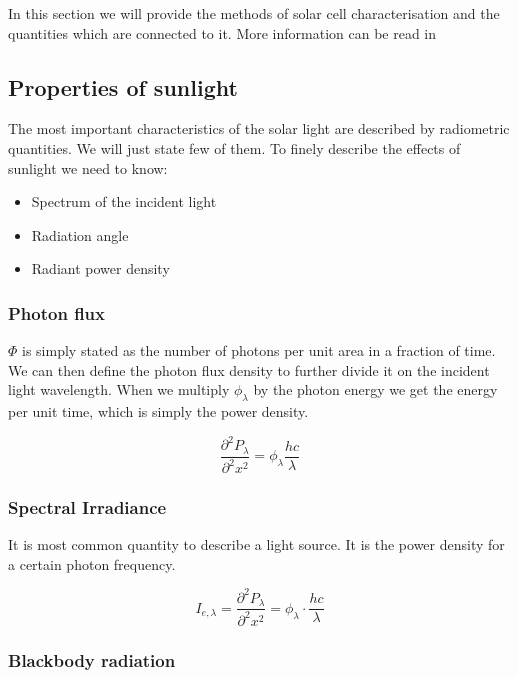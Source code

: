 In this section we will provide the methods of solar cell characterisation and the quantities which are connected to it. More information can be read in \cite{pv}

\subsection{Properties of sunlight}

The most important characteristics of the solar light are described by radiometric quantities. We will just state few of them. To finely describe the effects of sunlight we need to know:

\begin{itemize}
\item Spectrum of the incident light
\item Radiation angle
\item Radiant power density
\end{itemize}

\subsubsection{Photon flux}
$\Phi$ is simply stated as the number of photons per unit area in a fraction of time. We can then define the photon flux density to further divide it on the incident light wavelength. When we multiply $\phi _{\lambda } $ by the photon energy we get the energy per unit time, which is simply the power density. 

\begin{equation}
\frac{\partial ^2 P_\lambda }{\partial ^2 x^2} = \phi _ {\lambda } \frac{hc}{\lambda }
\end{equation}

\subsubsection{Spectral Irradiance}

It is most common quantity to describe a light source. It is the power density for a certain photon frequency. 

\begin{equation}
I_{e,\lambda } = \frac{\partial ^2 P_\lambda }{\partial ^2 x^2} = \phi_\lambda \cdot \frac{hc}{\lambda }
\end{equation}

\subsubsection{Blackbody radiation}

